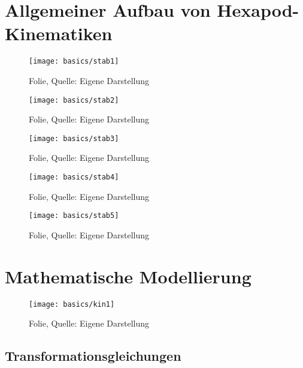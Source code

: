 \thispagestyle{scrheadings}
\section{Allgemeiner Aufbau von Hexapod-Kinematiken}
\label{basics-aufbau}

\begin{figure}[!htb]
    \centering
    \texttt{[image: basics/stab1]}
    \caption[Folie]{Folie, Quelle: Eigene Darstellung}
    \label{fig:stab1}
\end{figure}

\begin{figure}[H]
    \centering
    \texttt{[image: basics/stab2]}
    \caption[Folie]{Folie, Quelle: Eigene Darstellung}
    \label{fig:stab2}
\end{figure}

\begin{figure}[H]
    \centering
    \texttt{[image: basics/stab3]}
    \caption[Folie]{Folie, Quelle: Eigene Darstellung}
    \label{fig:stab3}
\end{figure}

\begin{figure}[H]
    \centering
    \texttt{[image: basics/stab4]}
    \caption[Folie]{Folie, Quelle: Eigene Darstellung}
    \label{fig:stab4}
\end{figure}

\begin{figure}[H]
    \centering
    \texttt{[image: basics/stab5]}
    \caption[Folie]{Folie, Quelle: Eigene Darstellung}
    \label{fig:stab5}
\end{figure}

\thispagestyle{scrheadings}
\section{Mathematische Modellierung}
\label{basics-modelling}

\begin{figure}[H]
    \centering
    \texttt{[image: basics/kin1]}
    \caption[Folie]{Folie, Quelle: Eigene Darstellung}
    \label{fig:kin1}
\end{figure}

\subsection{Transformationsgleichungen}
\label{basics-transformation}

